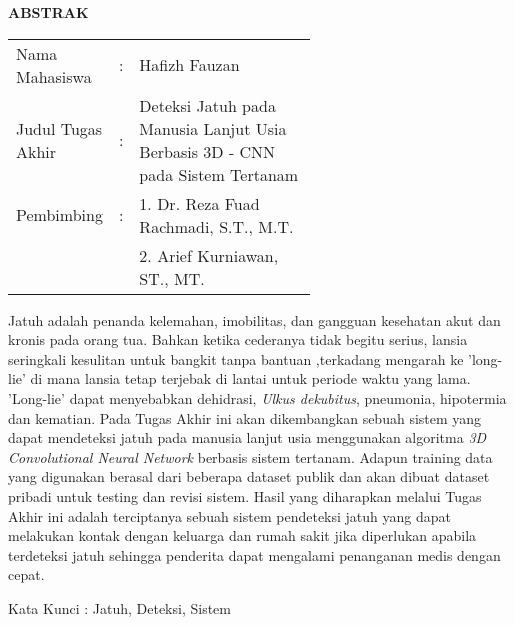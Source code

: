 \begin{center}
\Large\textbf{ABSTRAK}
\end{center}
\vspace{1ex}

\begin{adjustwidth}{-0.2cm}{}
\begin{tabular}{lcp{0.6\linewidth}}
Nama Mahasiswa &:& Hafizh Fauzan \\
Judul Tugas Akhir &:& Deteksi Jatuh pada Manusia Lanjut Usia Berbasis 3D - CNN pada Sistem Tertanam\\
Pembimbing &:& 1. Dr. Reza Fuad Rachmadi, S.T., M.T. \\
& & 2. Arief Kurniawan, ST., MT.\\
\end{tabular}
\end{adjustwidth}
\vspace{1ex}

\setlength{\parindent}{0cm} Jatuh adalah penanda kelemahan, imobilitas, dan gangguan kesehatan akut dan kronis pada orang tua. Bahkan ketika cederanya tidak begitu serius, lansia seringkali kesulitan untuk bangkit tanpa bantuan ,terkadang mengarah ke 'long-lie' di mana lansia tetap terjebak di lantai untuk periode waktu yang lama. 'Long-lie' dapat menyebabkan dehidrasi, \textit{Ulkus dekubitus}, pneumonia, hipotermia dan kematian. Pada Tugas Akhir ini akan dikembangkan sebuah sistem yang dapat mendeteksi jatuh pada manusia lanjut usia menggunakan algoritma \textit{3D Convolutional Neural Network} berbasis sistem tertanam. Adapun training data yang digunakan berasal dari beberapa dataset publik dan akan dibuat dataset pribadi untuk testing dan revisi sistem. Hasil yang diharapkan melalui Tugas Akhir ini adalah terciptanya sebuah sistem pendeteksi jatuh yang dapat melakukan kontak dengan keluarga dan rumah sakit jika diperlukan apabila terdeteksi jatuh sehingga penderita dapat mengalami penanganan medis dengan cepat.


\vspace{2ex}

Kata Kunci : Jatuh, Deteksi, Sistem
\newpage
